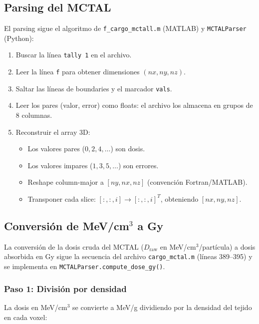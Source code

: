 \documentclass[12pt,a4paper]{article}
\begin{document}
\subsection{Parsing del MCTAL}

El parsing sigue el algoritmo de \texttt{f\_cargo\_mctall.m} (MATLAB) y
\texttt{MCTALParser} (Python):

\begin{enumerate}
    \item Buscar la línea \texttt{tally    1} en el archivo.
    \item Leer la línea \texttt{f} para obtener dimensiones $(nx, ny, nz)$.
    \item Saltar las líneas de boundaries y el marcador \texttt{vals}.
    \item Leer los pares (valor, error) como floats: el archivo los
        almacena en grupos de 8 columnas.
    \item Reconstruir el array 3D:
        \begin{itemize}
            \item Los valores pares ($0,2,4,\dots$) son dosis.
            \item Los valores impares ($1,3,5,\dots$) son errores.
            \item Reshape column-major a $[ny, nx, nz]$ (convención
                Fortran/MATLAB).
            \item Transponer cada slice: $[:,:,i] \to [:,:,i]^T$, obteniendo
                $[nx, ny, nz]$.
        \end{itemize}
\end{enumerate}

\subsection{Conversión de MeV/cm$^3$ a Gy}

La conversión de la dosis cruda del MCTAL ($D_{\text{raw}}$ en
MeV/cm$^3$/partícula) a dosis absorbida en Gy sigue la secuencia del
archivo \texttt{cargo\_mctal.m} (líneas 389--395) y se implementa en
\texttt{MCTALParser.compute\_dose\_gy()}.

\subsubsection{Paso 1: División por densidad}

La dosis en MeV/cm$^3$ se convierte a MeV/g dividiendo por la densidad del
tejido en cada voxel:
\end{document}
